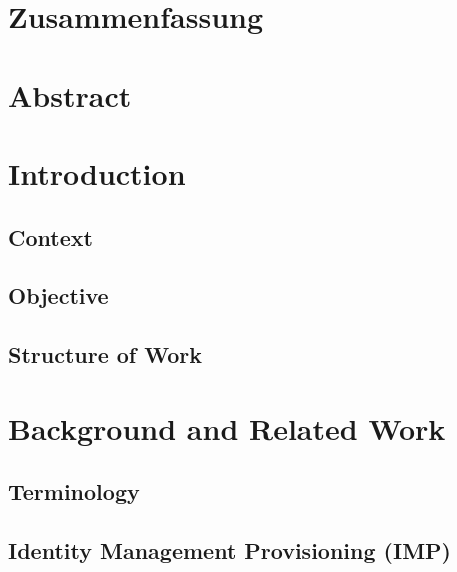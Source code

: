 \documentclass[
     12pt,         %
     a4paper,      %
     BCOR=10mm,version=first,     %
     DIV=14,version=first,        %
     ]{scrreprt}
\begin{document}
\chapter*{Zusammenfassung}

\newpage

\chapter*{Abstract}

\newpage

\tableofcontents
\cleardoublepage
{}

\chapter{Introduction}

\section{Context}



\section{Objective}



\section{Structure of Work}



\chapter{Background and Related Work}

\section{Terminology}



\section{Identity Management Provisioning (IMP)}


\end{document}
